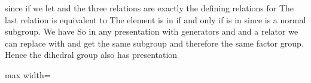 \documentclass[11pt,oneside]{article}
\begin{document}
\begin{BookBody}
\noindent since if we let  and  the three relations are exactly the defining relations for The last relation  is equivalent to  The element  is in  if and only if  is in  since  is a normal subgroup. We have   So in any presentation with generators  and  and a relator  we can replace  with  and get the same subgroup  and therefore the same factor group. Hence the dihedral group also has presentation

\begin{center}\begin{adjustbox}{max width=\linewidth}\end{adjustbox}\end{center}

\end{BookBody}

\BookNarrativetrue
\end{document}
